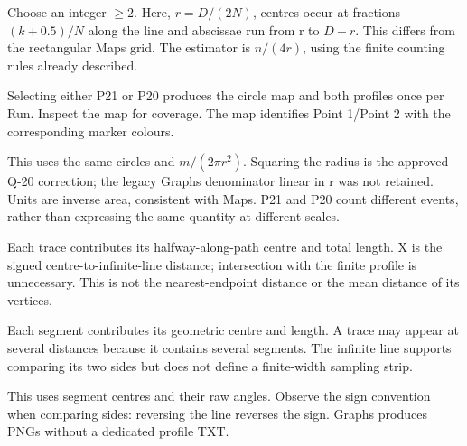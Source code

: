 Choose an integer  \(\geq2\). Here, \(r=D/(2N)\), centres occur at fractions \((k+0.5)/N\) along the line and abscissae run from r to \(D-r\). This differs from the rectangular Maps grid. The estimator is \(n/(4r)\), using the finite counting rules already described.

Selecting either P21 or P20 produces the circle map and both profiles once per Run. Inspect the map for coverage. The map identifies Point 1/Point 2 with the corresponding marker colours.

This uses the same circles and \(m/(2\pi r^2)\). Squaring the radius is the approved Q-20 correction; the legacy Graphs denominator linear in r was not retained. Units are inverse area, consistent with Maps. P21 and P20 count different events, rather than expressing the same quantity at different scales.

Each trace contributes its halfway-along-path centre and total length. X is the signed centre-to-infinite-line distance; intersection with the finite profile is unnecessary. This is not the nearest-endpoint distance or the mean distance of its vertices.

Each segment contributes its geometric centre and length. A trace may appear at several distances because it contains several segments. The infinite line supports comparing its two sides but does not define a finite-width sampling strip.

This uses segment centres and their raw angles. Observe the sign convention when comparing sides: reversing the line reverses the sign. Graphs produces PNGs without a dedicated profile TXT.
